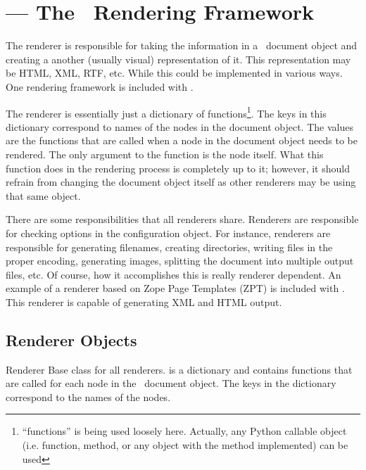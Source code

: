 
\section{ --- The \plasTeX\ Rendering Framework}



The renderer is responsible for taking the information in a \plasTeX\
document object and creating a another (usually visual) representation of it.  
This representation may be HTML, XML, RTF, etc.  While this could be
implemented in various ways.  One rendering framework is included with
\plasTeX.

The renderer is essentially just a dictionary of functions\footnote{
``functions'' is being used loosely here.  Actually, any Python callable
object (i.e. function, method, or any object with the \method{__call__}
method implemented) can be used}.  The
keys in this dictionary correspond to names of the nodes in the document
object.  The values are the functions that are called when a
node in the document object needs to be rendered.  The only argument
to the function is the node itself.  What this function
does in the rendering process is completely up to it; however, it should
refrain from changing the document object itself as other renderers 
may be using that same object.

There are some responsibilities that all renderers share.  Renderers
are responsible for checking options in the configuration object.
For instance, renderers are responsible for generating filenames, 
creating directories, writing files in the proper encoding, generating
images, splitting the document into multiple output files, etc.
Of course, how it accomplishes this is really renderer dependent.
An example of a renderer based on Zope Page Templates (ZPT) is included
with \plasTeX.  This renderer is capable of generating XML and HTML
output.


\subsection{Renderer Objects}

\begin{classdesc}{Renderer}{}
Base class for all renderers.   is a dictionary and
contains functions that are called for each node in the \plasTeX\
document object.  The keys in the dictionary correspond to the names of
the nodes.
\end{classdesc}

